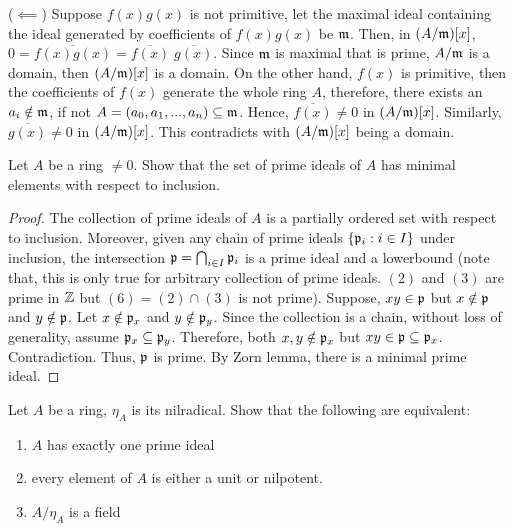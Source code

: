 \begin{longproof}
\begin{enumerate}
		($\impliedby$) Suppose $f(x)g(x)$ is not primitive, let the maximal ideal containing the ideal generated by coefficients of $f(x)g(x)$ be $\mathfrak{m}$. Then, in $(A / \mathfrak{m})[x]$, $0 = \overline{f(x)g(x)} = \overline{f(x)} \; \overline{g(x)}$. Since $\mathfrak{m}$ is maximal that is prime, $A / \mathfrak{m}$ is a domain, then $(A / \mathfrak{m})[x]$ is a domain. On the other hand, $f(x)$ is primitive, then the coefficients of $f(x)$ generate the whole ring $A$, therefore, there exists an $a_i \notin \mathfrak{m}$, if not $A = (a_0, a_1, ..., a_n) \subseteq \mathfrak{m}$. Hence, $\overline{f(x)} \neq 0$ in $(A / \mathfrak{m})[x]$. Similarly, $\overline{g(x)} \neq 0$ in $(A / \mathfrak{m})[x]$. This contradicts with $(A / \mathfrak{m})[x]$ being a domain.
		
	\end{enumerate}
\end{longproof}

\begin{problem}
	Let $A$ be a ring $\neq 0$. Show that the set of prime ideals of $A$ has minimal elements with respect to inclusion.
\end{problem}

\begin{proof}
	The collection of prime ideals of $A$ is a partially ordered set with respect to inclusion. Moreover, given any chain of prime ideals $\{\mathfrak{p}_i: i \in I\}$ under inclusion, the intersection $\mathfrak{p} = \bigcap_{i \in I} \mathfrak{p}_i$ is a prime ideal and a lowerbound (note that, this is only true for arbitrary collection of prime ideals. $(2)$ and $(3)$ are prime in $\mathbb{Z}$ but $(6) = (2) \cap (3)$ is not prime). Suppose, $xy \in \mathfrak{p}$ but $x \notin \mathfrak{p}$ and $y \notin \mathfrak{p}$. Let $x \notin \mathfrak{p}_x$ and $y \notin \mathfrak{p}_y$. Since the collection is a chain, without loss of generality, assume $\mathfrak{p}_x \subseteq \mathfrak{p}_y$. Therefore, both $x, y \notin \mathfrak{p}_x$ but $xy \in \mathfrak{p} \subseteq \mathfrak{p}_x$. Contradiction. Thus, $\mathfrak{p}$ is prime. By Zorn lemma, there is a minimal prime ideal.
\end{proof}

\begin{problem}
	Let $A$ be a ring, $\eta_A$ is its nilradical. Show that the following are equivalent:
	\begin{enumerate}
		\item $A$ has exactly one prime ideal
		\item every element of $A$ is either a unit or nilpotent.
		\item $A / \eta_A$ is a field
	\end{enumerate}
\end{problem}

